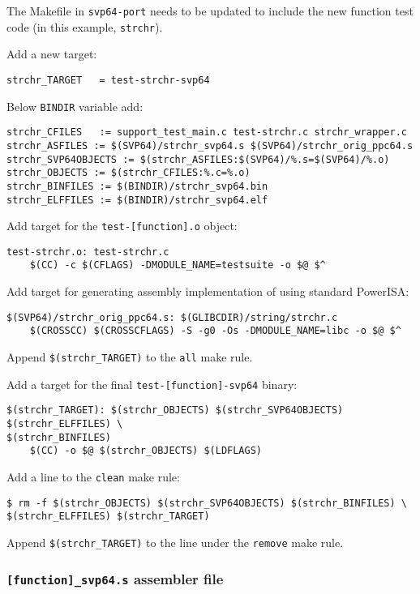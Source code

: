 The Makefile in \texttt{svp64-port} needs to be updated to include the new
function test code (in this example, \texttt{strchr}).

Add a new target:

\begin{verbatim}
strchr_TARGET	= test-strchr-svp64
\end{verbatim}

Below \texttt{BINDIR} variable add:
\begin{verbatim}
strchr_CFILES	:= support_test_main.c test-strchr.c strchr_wrapper.c
strchr_ASFILES := $(SVP64)/strchr_svp64.s $(SVP64)/strchr_orig_ppc64.s
strchr_SVP64OBJECTS := $(strchr_ASFILES:$(SVP64)/%.s=$(SVP64)/%.o)
strchr_OBJECTS := $(strchr_CFILES:%.c=%.o)
strchr_BINFILES := $(BINDIR)/strchr_svp64.bin
strchr_ELFFILES := $(BINDIR)/strchr_svp64.elf
\end{verbatim}

Add target for the \texttt{test-[function].o} object:
\begin{verbatim}
test-strchr.o: test-strchr.c
	$(CC) -c $(CFLAGS) -DMODULE_NAME=testsuite -o $@ $^
\end{verbatim}

Add target for generating assembly implementation of using standard PowerISA:
\begin{verbatim}
$(SVP64)/strchr_orig_ppc64.s: $(GLIBCDIR)/string/strchr.c
	$(CROSSCC) $(CROSSCFLAGS) -S -g0 -Os -DMODULE_NAME=libc -o $@ $^
\end{verbatim}

Append \texttt{\$(strchr\_TARGET)} to the \texttt{all} make rule.

Add a target for the final \texttt{test-[function]-svp64} binary:
\begin{verbatim}
$(strchr_TARGET): $(strchr_OBJECTS) $(strchr_SVP64OBJECTS) $(strchr_ELFFILES) \
$(strchr_BINFILES)
	$(CC) -o $@ $(strchr_OBJECTS) $(LDFLAGS)
\end{verbatim}

Add a line to the \texttt{clean} make rule:
\begin{verbatim}
$ rm -f $(strchr_OBJECTS) $(strchr_SVP64OBJECTS) $(strchr_BINFILES) \
$(strchr_ELFFILES) $(strchr_TARGET)
\end{verbatim}

Append \texttt{\$(strchr\_TARGET)} to the line under the \texttt{remove} make rule.

\subsubsection{\texttt{[function]\_svp64.s} assembler file}

